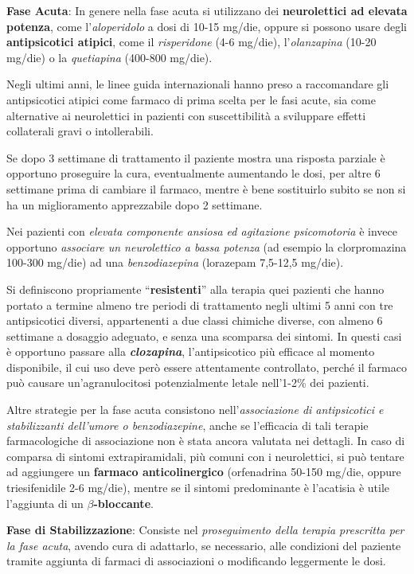 \begin{itemize}
\textbf{Fase Acuta}: In genere nella fase acuta si utilizzano dei
\textbf{neurolettici ad elevata potenza}, come l'\emph{aloperidolo} a
dosi di 10-15 mg/die, oppure si possono usare degli
\textbf{antipsicotici atipici}, come il \emph{risperidone} (4-6 mg/die),
l'\emph{olanzapina} (10-20 mg/die) o la \emph{quetiapina} (400-800
mg/die).

Negli ultimi anni, le linee guida internazionali hanno preso a
raccomandare gli antipsicotici atipici come farmaco di prima scelta per
le fasi acute, sia come alternative ai neurolettici in pazienti con
suscettibilità a sviluppare effetti collaterali gravi o intollerabili.

Se dopo 3 settimane di trattamento il paziente mostra una risposta
parziale è opportuno proseguire la cura, eventualmente aumentando le
dosi, per altre 6 settimane prima di cambiare il farmaco, mentre è bene
sostituirlo subito se non si ha un miglioramento apprezzabile dopo 2
settimane.

Nei pazienti con \emph{elevata componente ansiosa ed agitazione
psicomotoria} è invece opportuno \emph{associare un neurolettico a bassa
potenza} (ad esempio la clorpromazina 100-300 mg/die) ad una
\emph{benzodiazepina} (lorazepam 7,5-12,5 mg/die).

Si definiscono propriamente ``\textbf{resistenti}'' alla terapia quei
pazienti che hanno portato a termine almeno tre periodi di trattamento
negli ultimi 5 anni con tre antipsicotici diversi, appartenenti a due
classi chimiche diverse, con almeno 6 settimane a dosaggio adeguato, e
senza una scomparsa dei sintomi. In questi casi è opportuno passare alla
\textbf{\emph{clozapina}}, l'antipsicotico più efficace al momento
disponibile, il cui uso deve però essere attentamente controllato,
perché il farmaco può causare un'agranulocitosi potenzialmente letale
nell'1-2\% dei pazienti.

Altre strategie per la fase acuta consistono nell'\emph{associazione di
antipsicotici e stabilizzanti dell'umore o benzodiazepine}, anche se
l'efficacia di tali terapie farmacologiche di associazione non è stata
ancora valutata nei dettagli. In caso di comparsa di sintomi
extrapiramidali, più comuni con i neurolettici, si può tentare ad
aggiungere un \textbf{farmaco anticolinergico} (orfenadrina 50-150
mg/die, oppure triesifenidile 2-6 mg/die), mentre se il sintomi
predominante è l'acatisia è utile l'aggiunta di un \textbf{$\beta$-bloccante}.

\textbf{Fase di Stabilizzazione}: Consiste nel \emph{proseguimento della
terapia prescritta per la fase acuta}, avendo cura di adattarlo, se
necessario, alle condizioni del paziente tramite aggiunta di farmaci di
associazioni o modificando leggermente le dosi.


\end{itemize}
